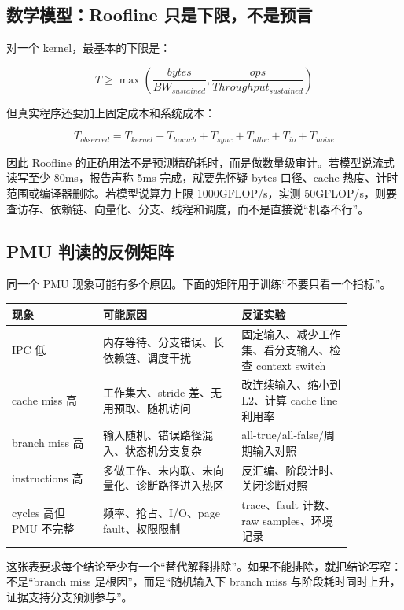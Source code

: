 \subsection{数学模型：Roofline 只是下限，不是预言}

对一个 kernel，最基本的下限是：

\[
T \ge \max\left(\frac{bytes}{BW_{sustained}}, \frac{ops}{Throughput_{sustained}}\right)
\]

但真实程序还要加上固定成本和系统成本：

\[
T_{observed} = T_{kernel} + T_{launch} + T_{sync} + T_{alloc} + T_{io} + T_{noise}
\]

因此 Roofline 的正确用法不是预测精确耗时，而是做数量级审计。若模型说流式读写至少 80ms，报告声称 5ms 完成，就要先怀疑 bytes 口径、cache 热度、计时范围或编译器删除。若模型说算力上限 1000GFLOP/s，实测 50GFLOP/s，则要查访存、依赖链、向量化、分支、线程和调度，而不是直接说“机器不行”。

\subsection{PMU 判读的反例矩阵}

同一个 PMU 现象可能有多个原因。下面的矩阵用于训练“不要只看一个指标”。

\begin{center}
\begin{tabular}{p{0.23\linewidth}p{0.35\linewidth}p{0.28\linewidth}}
\toprule
现象 & 可能原因 & 反证实验 \\
\midrule
IPC 低 & 内存等待、分支错误、长依赖链、调度干扰 & 固定输入、减少工作集、看分支输入、检查 context switch \\
cache miss 高 & 工作集大、stride 差、无用预取、随机访问 & 改连续输入、缩小到 L2、计算 cache line 利用率 \\
branch miss 高 & 输入随机、错误路径混入、状态机分支复杂 & all-true/all-false/周期输入对照 \\
instructions 高 & 多做工作、未内联、未向量化、诊断路径进入热区 & 反汇编、阶段计时、关闭诊断对照 \\
cycles 高但 PMU 不完整 & 频率、抢占、I/O、page fault、权限限制 & trace、fault 计数、raw samples、环境记录 \\
\bottomrule
\end{tabular}
\end{center}

这张表要求每个结论至少有一个“替代解释排除”。如果不能排除，就把结论写窄：不是“branch miss 是根因”，而是“随机输入下 branch miss 与阶段耗时同时上升，证据支持分支预测参与”。

